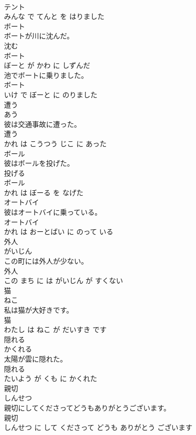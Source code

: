 \documentclass[8pt]{extreport}
\begin{document}
\begin{CJK}{UTF8}{min}
\\	テント 
\\	みんな で てんと を はりました			
\\	ボート	
\\	ボートが川に沈んだ。	
\\	沈む 
\\	ボート 
\\	ぼーと が かわ に しずんだ			
\\	池でボートに乗りました。	
\\	ボート 
\\	いけ で ぼーと に のりました			
\\	遭う	
\\	あう			
\\	彼は交通事故に遭った。	
\\	遭う 
\\	かれ は こうつう じこ に あった			
\\	ボール	
\\	彼はボールを投げた。	
\\	投げる 
\\	ボール 
\\	かれ は ぼーる を なげた			
\\	オートバイ	
\\	彼はオートバイに乗っている。	
\\	オートバイ 
\\	かれ は おーとばい に のって いる			
\\	外人	
\\	がいじん			
\\	この町には外人が少ない。	
\\	外人 
\\	この まち に は がいじん が すくない			
\\	猫	
\\	ねこ			
\\	私は猫が大好きです。	
\\	猫 
\\	わたし は ねこ が だいすき です			
\\	隠れる	
\\	かくれる			
\\	太陽が雲に隠れた。	
\\	隠れる 
\\	たいよう が くも に かくれた			
\\	親切	
\\	しんせつ			
\\	親切にしてくださってどうもありがとうございます。	
\\	親切 
\\	しんせつ に して くださって どうも ありがとう ございます			

\end{CJK}
\end{document}
